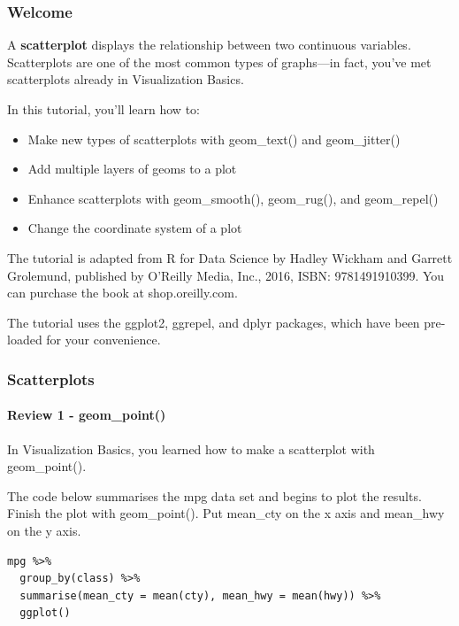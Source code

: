 \documentclass[
]{article}
\providecommand{\tightlist}{%
  \setlength{\itemsep}{0pt}\setlength{\parskip}{0pt}}
\begin{document}
\hypertarget{welcome-9}{%
\subsubsection{Welcome}\label{welcome-9}}

A \textbf{scatterplot} displays the relationship between two continuous
variables. Scatterplots are one of the most common types of graphs---in
fact, you've met scatterplots already in Visualization Basics.

In this tutorial, you'll learn how to:

\begin{itemize}
\tightlist
\item
  Make new types of scatterplots with geom\_text() and geom\_jitter()
\item
  Add multiple layers of geoms to a plot
\item
  Enhance scatterplots with geom\_smooth(), geom\_rug(), and
  geom\_repel()
\item
  Change the coordinate system of a plot
\end{itemize}

The tutorial is adapted from R for Data Science by Hadley Wickham and
Garrett Grolemund, published by O'Reilly Media, Inc., 2016, ISBN:
9781491910399. You can purchase the book at shop.oreilly.com.

The tutorial uses the ggplot2, ggrepel, and dplyr packages, which have
been pre-loaded for your convenience.

\hypertarget{scatterplots-1}{%
\subsubsection{Scatterplots}\label{scatterplots-1}}

\hypertarget{review-1---geom_point}{%
\paragraph{Review 1 - geom\_point()}\label{review-1---geom_point}}

In Visualization Basics, you learned how to make a scatterplot with
geom\_point().

The code below summarises the mpg data set and begins to plot the
results. Finish the plot with geom\_point(). Put mean\_cty on the x axis
and mean\_hwy on the y axis.

\begin{verbatim}
mpg %>% 
  group_by(class) %>% 
  summarise(mean_cty = mean(cty), mean_hwy = mean(hwy)) %>% 
  ggplot()
\end{verbatim}
\end{document}
